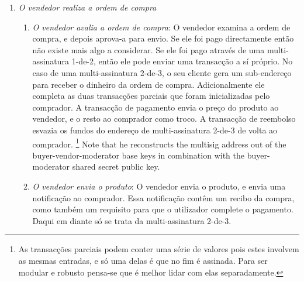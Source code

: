 \begin{enumerate}
\begin{enumerate}
A transacção contêm a ordem de compra, a hash da transacção de depósito, as transacções iniciadas de multi-assinatura, e a chave pública do segredo partilhado entre o comprador e o moderador.
\footnote{O software do comprador deve acompanhar os detalhes das ordens de compra, como o preço total, para que mais tarde o conteúdo das transacções de multi-assinatura seja verificado antes de assinar.}   
\fi
\iffalse
    \end{enumerate}{}
    \item {\em O vendedor realiza a ordem de compra}
    \begin{enumerate}
        \item {\em O vendedor avalia a ordem de compra}: O vendedor examina a ordem de compra, e depois aprova-a para envio. Se ele foi pago directamente então não existe mais algo a considerar. Se ele foi pago através de uma multi-assinatura 1-de-2, então ele pode enviar uma transacção a sí próprio. No caso de uma multi-assinatura 2-de-3, o seu cliente gera um sub-endereço para receber o dinheiro da ordem de compra. Adicionalmente ele completa as duas transacções parciais que foram inicializadas pelo comprador. A transacção de pagamento envia o preço do produto ao vendedor, e o resto ao comprador como troco. A transacção de reembolso esvazia os fundos do endereço de multi-assinatura 2-de-3 de volta ao comprador.
\footnote{As transacções parciais podem conter uma série de valores pois estes involvem as mesmas entradas, e só uma delas é que no fim é assinada. Para ser modular e robusto pensa-se que é melhor lidar com elas separadamente.} 
Note that he reconstructs the multisig address out of the buyer-vendor-moderator base keys in combination with the buyer-moderator shared secret public key.
        \item {\em O vendedor envia o produto}: O vendedor envia o produto, e envia uma notificação ao comprador. Essa notificação contêm um recibo da compra, como também um requisito para que o utilizador complete o pagamento. Daqui em diante só se trata  da multi-assinatura 2-de-3.    

\end{enumerate}
\end{enumerate}
